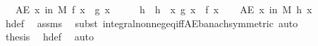 \begin{isabellebody}
\ \ \ {\isachardoublequoteopen}AE\ x\ in\ M{\isachardot}{\kern0pt}\ f\ x\ {\isacharequal}{\kern0pt}\ g\ x{\isachardoublequoteclose}\isanewline
%
\isadelimproof
%
\endisadelimproof
%
\isatagproof
{}\isamarkupfalse%
\ {\isacharminus}{\kern0pt}\isanewline
\ \ \isamarkupfalse%
\ h\ \ {\isachardoublequoteopen}h\ {\isacharequal}{\kern0pt}\ {\isacharparenleft}{\kern0pt}{\isasymlambda}x{\isachardot}{\kern0pt}\ g\ x\ {\isacharminus}{\kern0pt}\ f\ x{\isacharparenright}{\kern0pt}{\isachardoublequoteclose}\isanewline
\ \ \isamarkupfalse%
\ {\isachardoublequoteopen}AE\ x\ in\ M{\isachardot}{\kern0pt}\ h\ x\ {\isacharequal}{\kern0pt}\ {}{\isachardoublequoteclose}\ \isamarkupfalse%
\ h{\isacharunderscore}{\kern0pt}def\ \isamarkupfalse%
\ assms\ \isamarkupfalse%
\ {\isacharparenleft}{\kern0pt}subst\ integral{\isacharunderscore}{\kern0pt}nonneg{\isacharunderscore}{\kern0pt}eq{\isacharunderscore}{\kern0pt}{}{\isacharunderscore}{\kern0pt}iff{\isacharunderscore}{\kern0pt}AE{\isacharunderscore}{\kern0pt}banach{\isacharbrackleft}{\kern0pt}symmetric{\isacharbrackright}{\kern0pt}{\isacharparenright}{\kern0pt}\ auto\isanewline
\ \ \isamarkupfalse%
\ \isamarkupfalse%
\ {\isacharquery}{\kern0pt}thesis\ \isamarkupfalse%
\ h{\isacharunderscore}{\kern0pt}def\ \isamarkupfalse%
\ auto\isanewline
{}\isamarkupfalse%
%
\endisatagproof
{\isafoldproof}%
%
\isadelimproof
\isanewline
%
\endisadelimproof
\isanewline
{}\isamarkupfalse%
\isanewline
%
\isadelimtheory
\isanewline
%
\endisadelimtheory
%
\isatagtheory
{}\isamarkupfalse%
%
\endisatagtheory
{\isafoldtheory}%
%
\isadelimtheory
%
\endisadelimtheory
%
\end{isabellebody}%
\endinput
